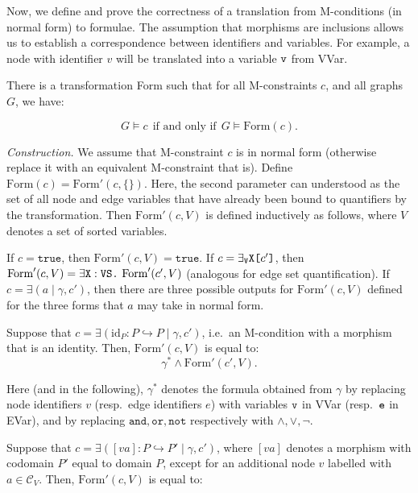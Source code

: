 \documentclass{llncs}
\newcommand{\mt}[1]{\text{\tt{#1}}}
\begin{document}
	Now, we define and prove the correctness of a translation from M-conditions (in normal form) to formulae. The assumption that morphisms are inclusions allows us to establish a correspondence between identifiers and variables. For example, a node with identifier $v$ will be translated into a variable $\tt v$ from VVar.
	
	\begin{theorem}\label{thm:Form}\rm
		There is a transformation Form such that for all M-constraints $c$, and all graphs $G$, we have:

		\[ G \models c\ \ \text{if and only if}\ \ G \models \text{Form}(c).\]

		\noindent \emph{Construction.} We assume that M-constraint $c$ is in normal form (otherwise replace it with an equivalent M-constraint that is). Define $\text{Form}(c) = \text{Form}'(c,\{\})$. Here, the second parameter can understood as the set of all node and edge variables that have already been bound to quantifiers by the transformation. Then $\text{Form}'(c,V)$ is defined inductively as follows, where $V$ denotes a set of sorted variables.

		If $c=\mathtt{true}$, then $\text{Form}'(c,V) = \mathtt{true}$. If $c = \exists_\mathtt{V}\mathtt{X}\mt{[}c'\mt{]}$, then $\text{Form}'(c,V) = \exists\mathtt{X}:\mathtt{VS}\mt{.}\ \text{Form}'(c',V)$ (analogous for edge set quantification). If $c=\exists(a\mid\gamma,c')$, then there are three possible outputs for $\text{Form}'(c,V)$ defined for the three forms that $a$ may take in normal form.

		Suppose that $c = \exists(\text{id}_P\!:P\hookrightarrow P\mid \gamma, c')$, i.e.\ an M-condition with a morphism that is an identity. Then, $\text{Form}'(c,V)$ is equal to:\\
		\[ \gamma^* \wedge \text{Form}'(c',V). \]


	\noindent Here (and in the following), $\gamma^*$ denotes the formula obtained from $\gamma$ by replacing node identifiers $v$ (resp.\ edge identifiers $e$) with variables $\tt v$ in VVar (resp.\ $\tt e$ in EVar), and by replacing $\mathtt{and},\mathtt{or},\mathtt{not}$ respectively with $\wedge,\vee,\neg$.



		Suppose that $c = \exists([va]\!:P\hookrightarrow P'\mid \gamma, c')$, where $[va]$ denotes a morphism with codomain $P'$ equal to domain $P$, except for an additional node $v$ labelled with $a\in\mathcal{C}_V$. Then, $\text{Form}'(c,V)$ is equal to:


\end{theorem}
\end{document}

